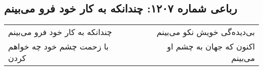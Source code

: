 \begin{center}
\section*{رباعی شماره ۱۲۰۷: چندانکه به کار خود فرو می‌بینم}
\label{sec:1207}
\begin{longtable}{l p{0.5cm} r}
چندانکه به کار خود فرو می‌بینم
&&
بی‌دیده‌گی خویش نکو می‌بینم
\\
با زحمت چشم خود چه خواهم کردن
&&
اکنون که جهان به چشم او می‌بینم
\\
\end{longtable}
\end{center}
